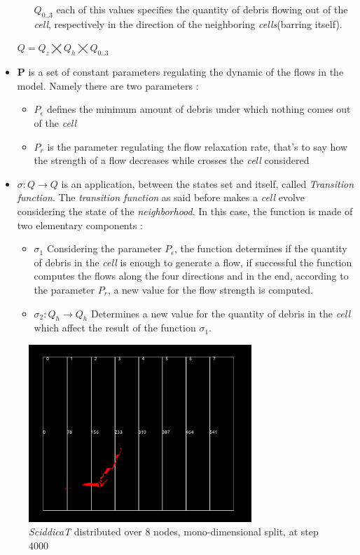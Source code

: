 \documentclass[12pt,a4paper,fleqn]{report}
\newcommand\bolden[1]{{\boldmath\bfseries#1}}
\begin{document}
\begin{itemize}
\begin{itemize}
$Q_{0..3}$ each of this values specifies the quantity of debris flowing out of the \textit{cell}, respectively in the direction of the neighboring \textit{cells}(barring itself).
\end{itemize}
\begin{center}
$ Q =Q_z \bigtimes Q_h \bigtimes Q_{0..3}$
\end{center}
\item
\textbf{P} is a set of constant parameters regulating the dynamic of the flows in the model. Namely there are two parameters :
\begin{itemize}
\item
\textit{$P_\epsilon$}  defines the minimum amount of debris under which nothing comes out of the \textit{cell}
\item
\textit{$P_r$}  is the parameter regulating the flow relaxation rate, that's to say how the strength of a flow decreases while crosses the \textit{cell} considered
\end{itemize}
\item
\bolden{$\sigma: Q \rightarrow Q $ }  is an application, between the states set and itself, called \textit{Transition function}. The \textit{transition function} as said before makes a \textit{cell} evolve considering the state of the \textit{neighborhood}. In this case, the function is made of two elementary components :
\begin{itemize}
\item \bolden{$\sigma_1$ } Considering the parameter $P_\epsilon$, the function determines if the quantity of debris in the \textit{cell} is enough to generate a flow, if successful the function computes the flows along the four directions and in the end, according to the parameter $P_r$, a new value for the flow strength is computed.
\item \bolden{$\sigma_2 : Q_h \rightarrow Q_h$ }  Determines a new value for the quantity of debris in the \textit{cell} which affect the result of the function $\sigma_1$.
\end{itemize}
\end{itemize}

 \begin{figure}[ht!]
\centering
    \includegraphics[trim=0mm 10mm 0mm 10mm,width=0.75\textwidth]{middle_state}
    \caption{\textit{SciddicaT} distributed over 8 nodes, mono-dimensional split, at step 4000}
\end{figure}
\end{document}
